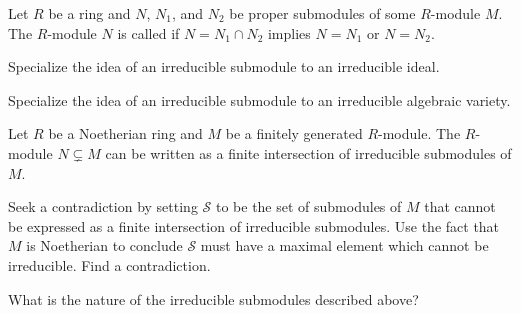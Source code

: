 \documentclass{ximera}
\begin{document}
\begin{definition}
  Let $R$ be a ring and $N$, $N_1$, and $N_2$ be proper submodules of
  some $R$-module $M$. The $R$-module $N$ is called 
  if $N = N_1\cap N_2$ implies $N=N_1$ or $N=N_2$.
\end{definition}


\begin{exercise}
  Specialize the idea of an irreducible submodule to an irreducible
  ideal.
\end{exercise}

\begin{exercise}
  Specialize the idea of an irreducible submodule to an irreducible
  algebraic variety.
\end{exercise}


\begin{lemma}\label{L:irrdecomp}
  Let $R$ be a Noetherian ring and $M$ be a finitely generated
  $R$-module. The $R$-module $N\subsetneq M$ can be written as a finite
  intersection of irreducible submodules of $M$.
  \begin{sketch}
    Seek a contradiction by setting $\mathcal{S}$ to be the set of
    submodules of $M$ that cannot be expressed as a finite
    intersection of irreducible submodules. Use the fact that $M$ is
    Noetherian to conclude $\mathcal{S}$ must have a maximal element
    which cannot be irreducible. Find a contradiction.
  \end{sketch}
\end{lemma}

\begin{question}
What is the nature of the irreducible submodules described above?
\end{question}
\end{document}
